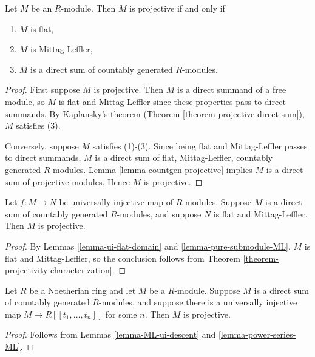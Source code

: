 \begin{theorem}
\label{theorem-projectivity-characterization}
Let $M$ be an $R$-module. Then $M$ is projective if and only if
\begin{enumerate}
\item $M$ is flat,
\item $M$ is Mittag-Leffler,
\item $M$ is a direct sum of countably generated $R$-modules.
\end{enumerate}
\end{theorem}

\begin{proof}
First suppose $M$ is projective.  Then $M$ is a direct summand of a free
module, so $M$ is flat and Mittag-Leffler since these properties pass to direct
summands. By Kaplansky's theorem (Theorem \ref{theorem-projective-direct-sum}),
$M$ satisfies (3).

\medskip\noindent
Conversely, suppose $M$ satisfies (1)-(3).  Since being flat and Mittag-Leffler
passes to direct summands, $M$ is a direct sum of flat, Mittag-Leffler,
countably generated $R$-modules.
Lemma \ref{lemma-countgen-projective}
implies $M$ is a direct sum of projective modules. Hence $M$ is projective.
\end{proof}

\begin{lemma}
\label{lemma-ML-ui-descent}
Let $f: M \to N$ be universally injective map of $R$-modules.  Suppose
$M$ is a direct sum of countably generated $R$-modules, and suppose $N$ is flat
and Mittag-Leffler.  Then $M$ is projective.
\end{lemma}

\begin{proof}
By
Lemmas \ref{lemma-ui-flat-domain} and
\ref{lemma-pure-submodule-ML},
$M$ is flat and Mittag-Leffler, so the conclusion follows from Theorem
\ref{theorem-projectivity-characterization}.
\end{proof}

\begin{lemma}
\label{lemma-universally-injective-submodule-powerseries}
Let $R$ be a Noetherian ring and let $M$ be a $R$-module.  Suppose $M$ is a
direct sum of countably generated $R$-modules, and suppose there is a
universally injective map $M \to R[[t_1, \ldots, t_n]]$ for some $n$.
Then $M$ is projective.
\end{lemma}

\begin{proof}
Follows from
Lemmas \ref{lemma-ML-ui-descent} and
\ref{lemma-power-series-ML}.
\end{proof}



